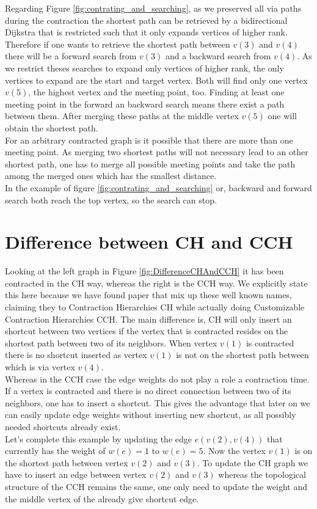 Regarding Figure \ref{fig:contrating_and_searching}, as we preserved all via paths during the contraction the shortest path can be retrieved by a bidirectional Dijkstra that is restricted such that it only expands vertices of higher rank. 
Therefore if one wants to retrieve the shortest path between $v(3)$ and $v(4)$ there will be a forward search from $v(3)$ and a backward search from $v(4)$. As we restrict theses searches to expand only vertices
of higher rank, the only vertices to expand are the start and target vertex. Both will find only one vertex $v(5)$, the highest vertex and the meeting point, too. Finding at least one meeting point in the forward an backward search means there exist a path between them.
After merging these paths at the middle vertex $v(5)$ one will obtain the shortest path.
\\
For an arbitrary contracted graph is it possible that there are more than one meeting point. As merging two shortest paths will not necessary lead to an other shortest path, one has to merge
all possible meeting points and take the path among the merged ones which has the smallest distance. 
\\ 
In the example of figure \ref{fig:contrating_and_searching} or, backward and forward search both reach the top vertex, so the search can stop.


\section{Difference between CH and CCH}

Looking at the left graph in Figure \ref*{fig:DifferenceCHAndCCH} it has been contracted in the CH way, whereas the right is the CCH way. We explicitly state this here because 
we have found paper \cite{Ouyang_2020} that mix up these well known names, claiming they to Contraction Hierarchies CH while actually doing Customizable Contraction Hierarchies CCH. 
The main difference is, CH will only insert an shortcut between two vertices if the vertex that is contracted resides on the shortest path between two of its neighbors. 
When vertex $v(1)$ is contracted there is no shortcut inserted as vertex $v(1)$ is not on the shortest path between which is via vertex $v(4)$.
\\
Whereas in the CCH case the edge weights do not play a role a contraction time. If a vertex is contracted and there is no direct connection between two of its neighbors, one has to insert a shortcut. This gives
the advantage that later on we can easily update edge weights without inserting new shortcut, as all possibly needed shortcuts already exist.
\\ 
Let's complete this example by updating the edge $e(v(2), v(4))$ that currently has the weight of $w(e)=1$ to $w(e) = 5$. Now the vertex $v(1)$ is on the shortest path between vertex $v(2)$ and $v(3)$. 
To update the CH graph we have to insert an edge between vertex $v(2)$ and $v(3)$ whereas the topological structure of the CCH remains the same, one only need to update the weight and the middle vertex of the already give shortcut edge.

